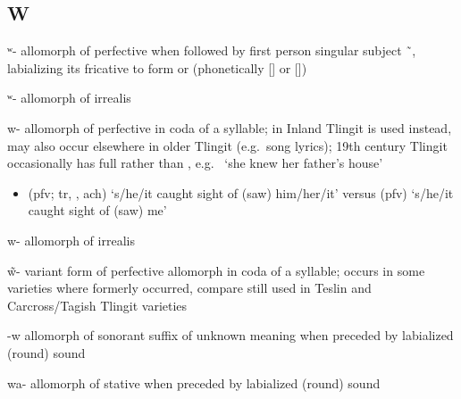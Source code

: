 \subsection{W}\label{sec:alphalist-w}
\begin{morphdesc}[resume*=alphalist]
\item[ʷ-]\label{m:ʷ-pfv}
	allomorph of perfective  when followed by
	first person singular subject  \~\ ,
	labializing its fricative to form  or 
	(phonetically [] or [])

\item[ʷ-]\label{m:ʷ-irr}
	allomorph of irrealis 

\item[w-]\label{m:w-pfv}
	allomorph of perfective  in coda of a syllable;
	in Inland Tlingit  is used instead, may also occur elsewhere in older Tlingit
		(e.g.\ song lyrics);
	19th century Tlingit occasionally has full  rather than ,
		e.g.\  ‘she knew her father’s house’
		\parencite[255.7]{swanton:1909}
	\begin{itemize}
	\item	{} (pfv; tr, , ach) ‘s/he/it caught sight of (saw) him/her/it’\newline
		versus  (pfv) ‘s/he/it caught sight of (saw) me’
	\end{itemize}

\item[w-]\label{m:w-irr}
	allomorph of irrealis 

\item[w̃-]\label{m:w̃-}
	variant form of perfective  allomorph in coda of a syllable;
	occurs in some varieties where  formerly occurred, compare  still used
	in Teslin and Carcross/Tagish Tlingit varieties

\item[-w]\label{m:-w}
	allomorph of  sonorant suffix of unknown meaning
	when preceded by labialized (round) sound

\item[wa-]\label{m:wa-}
	allomorph of stative  when preceded by labialized (round) sound


\end{morphdesc}
